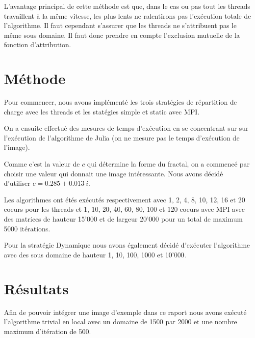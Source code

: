 \documentclass[12pt,a4paper,oneside, titlepage]{report}
\begin{document}
			L'avantage principal de cette méthode est que, dans le cas ou pas tout les threads travaillent à la même vitesse, les plus lents ne ralentirons pas l'exécution totale de l'algorithme.
			Il faut cependant s'assurer que les threads ne s'attribuent pas le même sous domaine. Il faut donc prendre en compte l'exclusion mutuelle de la fonction d'attribution.

	\section*{Méthode}
		 Pour commencer, nous avons implémenté les trois stratégies de répartition de charge avec les threads et les statégies simple et static avec MPI.

		 On a ensuite effectué des mesures de temps d'exécution en se concentrant sur sur l'exécution de l'algorithme de Julia (on ne mesure pas le temps d'exécution de l'image).

		 Comme c'est la valeur de $c$ qui détermine la forme du fractal, on a commencé par choisir une valeur qui donnait une image intéressante. Nous avons décidé d'utiliser $c = 0.285 + 0.013\ i$.

		 Les algorithmes ont étés exécutés respectivement avec 1, 2, 4, 8, 10, 12, 16 et 20 coeurs pour les threads et 1, 10, 20, 40, 60, 80, 100 et 120 coeurs avec MPI avec des matrices de hauteur 15'000 et de largeur 20'000 pour un total de maximum 5000 itérations.

		 Pour la stratégie Dynamique nous avons également décidé d'exécuter l'algorithme avec des sous domaine de hauteur 1, 10, 100, 1000 et 10'000.

	\newpage
	\section*{Résultats}

		Afin de pouvoir intégrer une image d'exemple dans ce raport nous avons exécuté l'algorithme trivial en local avec un domaine de 1500 par 2000 et une nombre maximum d'itération de 500.
\end{document}
